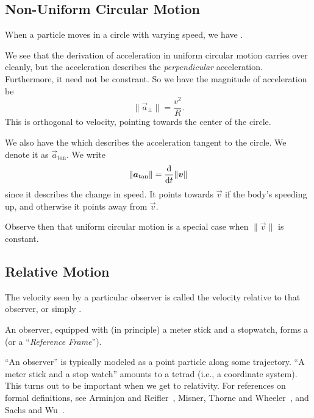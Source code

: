 \subsection{Non-Uniform Circular Motion}
\begin{definition}
When a particle moves in a circle with varying speed, we have
.
\end{definition}
\M
We see that the derivation of acceleration in uniform circular motion
carries over cleanly, but the acceleration describes the
\emph{perpendicular} acceleration. Furthermore, it need not be
constrant. So we have the magnitude of acceleration be
\begin{equation}
  \|\vec{a}_{\perp}\| = \frac{v^{2}}{R}.
\end{equation}
This is orthogonal to velocity, pointing towards the center of the
circle.

\begin{definition}
We also have the  which describes the
acceleration tangent to the circle. We denote it as
$\vec{a}_{\text{tan}}$. We write
\begin{equation}
\|\vec{a}_{\text{tan}}\| = \frac{\D}{\D t}\|\vec{v}\|
\end{equation}
since it describes the change in speed. It points towards $\vec{v}$ if
the body's speeding up, and otherwise it points away from $\vec{v}$.
\end{definition}
\begin{remark}
Observe then that uniform circular motion is a special case when
$\|\vec{v}\|$ is constant.
\end{remark}

\subsection{Relative Motion}
\begin{definition}
The velocity seen by a particular observer is called the velocity
relative to that observer, or simply .
\end{definition}

\begin{definition}
An observer, equipped with (in principle) a meter stick and a stopwatch,
forms a  (or a ``\textit{Reference Frame\/}'').
\end{definition}
\begin{remark}
``An observer'' is typically modeled as a point particle along some
trajectory. ``A meter stick and a stop watch'' amounts to a tetrad
(i.e., a coordinate system). This turns out to be important when we get
to relativity. For references on formal definitions, see Arminjon and
Reifler~\cite{Arminjon:2010ah}, Misner, Thorne and Wheeler~\cite[ch 6
and \S13.6]{Misner:1974qy}, and Sachs and Wu~\cite[ch 2]{sachs1977gr}.
\end{remark}
